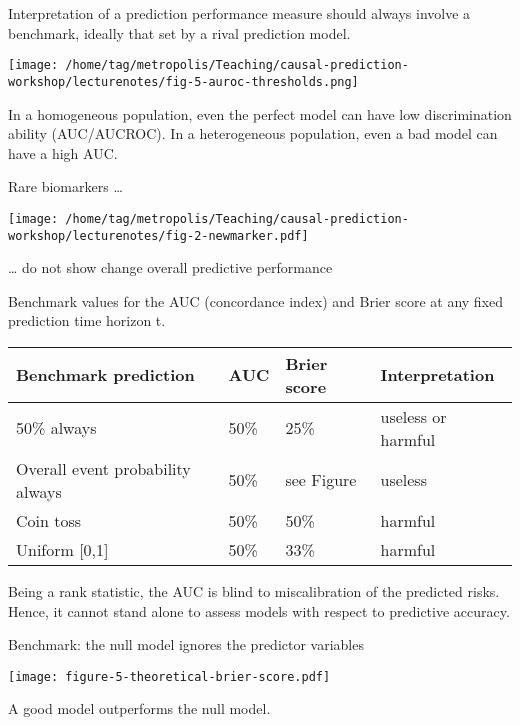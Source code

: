 \documentclass{beamer}\usepackage{listings}
\begin{document}
\begin{frame}[label={sec:org1bfa652}]{}
Interpretation of a prediction performance measure should always
involve a benchmark, ideally that set by a rival prediction model.
\vfill

\begin{center}
\texttt{[image: /home/tag/metropolis/Teaching/causal-prediction-workshop/lecturenotes/fig-5-auroc-thresholds.png]}
\label{fig:1}
\end{center}

In a homogeneous population, even the perfect model can have low
discrimination ability (AUC/AUCROC). In a heterogeneous population, even a
bad model can have a high AUC.
\end{frame}
\begin{frame}[label={sec:orge1893b0}]{Rare biomarkers \ldots{}}
\begin{center}
\texttt{[image: /home/tag/metropolis/Teaching/causal-prediction-workshop/lecturenotes/fig-2-newmarker.pdf]}
\end{center}

\ldots{} do not show change overall predictive performance 
\end{frame}
\begin{frame}[label={sec:org3d0861c}]{}
Benchmark values for the AUC (concordance index) and Brier score at any fixed prediction time horizon t.

\begin{center}
\begin{tabular}{llll}
Benchmark prediction & AUC & Brier score & Interpretation\\
\hline
50\% always & 50\% & 25\% & useless or harmful\\
Overall event probability always & 50\% & see Figure & useless\\
Coin toss & 50\% & 50\% & harmful\\
Uniform [0,1] & 50\% & 33\% & harmful\\
\end{tabular}
\end{center}

Being a rank statistic, the AUC is blind to
miscalibration of the predicted risks.
Hence, it cannot stand alone to assess models with respect to predictive accuracy.
\end{frame}
\begin{frame}[label={sec:org4a18f1b}]{Benchmark: the null model ignores the predictor variables}
\begin{center}
\texttt{[image: figure-5-theoretical-brier-score.pdf]}
\end{center}

A good model outperforms the null model.
\end{frame}
\end{document}
